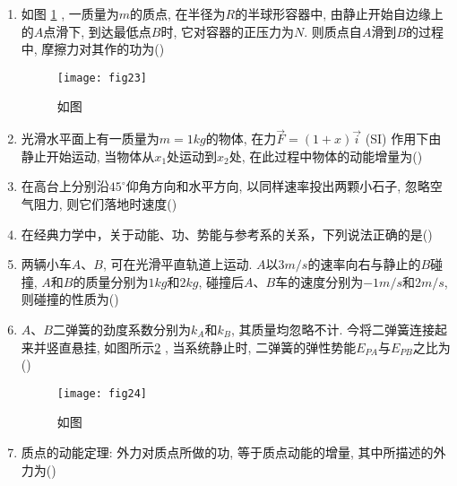 \begin{enumerate}
    \item 如图 \ref{fig:23} , 一质量为$m$的质点, 在半径为$R$的半球形容器中, 由静止开始自边缘上的$A$点滑下, 到达最低点$B$时, 它对容器的正压力为$N$. 则质点自$A$滑到$B$的过程中, 摩擦力对其作的功为(\hspace{1pc})
    \begin{figure}[H]
        \centering
        \texttt{[image: fig23]}
            \caption{如图}\label{fig:23}
    \end{figure}
    \item 光滑水平面上有一质量为$m=1kg$的物体, 在力$\vec{F} = (1+x)\vec{i}$  (SI) 作用下由静止开始运动, 当物体从$x_1$处运动到$x_2$处, 在此过程中物体的动能增量为(\hspace{1pc})
    
    \item 在高台上分别沿$45^\circ$仰角方向和水平方向, 以同样速率投出两颗小石子, 忽略空气阻力, 则它们落地时速度(\hspace{1pc})
    \item 在经典力学中，关于动能、功、势能与参考系的关系，下列说法正确的是(\hspace{1pc})
    \item 两辆小车$A$、$B$, 可在光滑平直轨道上运动. $A$以$3 m/s$的速率向右与静止的$B$碰撞, $A$和$B$的质量分别为$1kg$和$2kg$, 碰撞后$A$、$B$车的速度分别为$-1 m/s$和$2 m/s$, 则碰撞的性质为(\hspace{1pc})    
    \item $A$、$B$二弹簧的劲度系数分别为$k_A$和$k_B$, 其质量均忽略不计. 今将二弹簧连接起来并竖直悬挂, 如图所示\ref{fig:24} , 当系统静止时, 二弹簧的弹性势能$E_{PA}$与$E_{PB}$之比为(\hspace{1pc})                                                 
    \begin{figure}[H]
        \centering
        \texttt{[image: fig24]}
            \caption{如图}\label{fig:24}
    \end{figure}
    \item 质点的动能定理: 外力对质点所做的功, 等于质点动能的增量, 其中所描述的外力为(\hspace{1pc})                                           
   
\end{enumerate}
